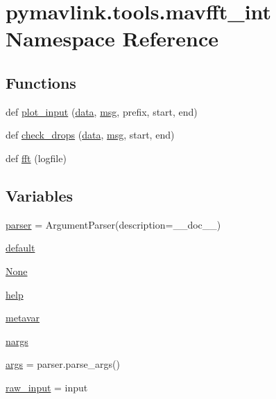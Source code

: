 \hypertarget{namespacepymavlink_1_1tools_1_1mavfft__int}{}\section{pymavlink.\+tools.\+mavfft\+\_\+int Namespace Reference}
\label{namespacepymavlink_1_1tools_1_1mavfft__int}
\subsection*{Functions}
\begin{DoxyCompactItemize}
\item 
def \mbox{\hyperlink{namespacepymavlink_1_1tools_1_1mavfft__int_ad676e5d5d87b9d552609c8379fe67870}{plot\+\_\+input}} (\mbox{\hyperlink{structdata}{data}}, \mbox{\hyperlink{stratnode_8cpp_a82cfe4ed9bc9e1b07c8bf209c324d85b}{msg}}, prefix, start, end)
\item 
def \mbox{\hyperlink{namespacepymavlink_1_1tools_1_1mavfft__int_a2ae39ff09927a9ada359b47eeb6e4c32}{check\+\_\+drops}} (\mbox{\hyperlink{structdata}{data}}, \mbox{\hyperlink{stratnode_8cpp_a82cfe4ed9bc9e1b07c8bf209c324d85b}{msg}}, start, end)
\item 
def \mbox{\hyperlink{namespacepymavlink_1_1tools_1_1mavfft__int_a4fea48da53af74119f00f7ddc66f87fb}{fft}} (logfile)
\end{DoxyCompactItemize}
\subsection*{Variables}
\begin{DoxyCompactItemize}
\item 
\mbox{\hyperlink{namespacepymavlink_1_1tools_1_1mavfft__int_a6399caa94e5528b597e4316134c2e937}{parser}} = Argument\+Parser(description=\+\_\+\+\_\+doc\+\_\+\+\_\+)
\item 
\mbox{\hyperlink{namespacepymavlink_1_1tools_1_1mavfft__int_a0e6a9b47e77e47f3e7a65850daa6bede}{default}}
\item 
\mbox{\hyperlink{namespacepymavlink_1_1tools_1_1mavfft__int_a51eb9bbd0dff74b63640e3ffcd329d47}{None}}
\item 
\mbox{\hyperlink{namespacepymavlink_1_1tools_1_1mavfft__int_a7edea492310d4fb2f90f2028606e2c5e}{help}}
\item 
\mbox{\hyperlink{namespacepymavlink_1_1tools_1_1mavfft__int_a319e6a187105fcfd07593d2568b83533}{metavar}}
\item 
\mbox{\hyperlink{namespacepymavlink_1_1tools_1_1mavfft__int_a410dc81e9fd097b44d0580d29cef27e7}{nargs}}
\item 
\mbox{\hyperlink{namespacepymavlink_1_1tools_1_1mavfft__int_a1096c19d6b3e2cd4071407b56498c6ac}{args}} = parser.\+parse\+\_\+args()
\item 
\mbox{\hyperlink{namespacepymavlink_1_1tools_1_1mavfft__int_a7e904179cf60a3f9dc98158156d21f8e}{raw\+\_\+input}} = input
\end{DoxyCompactItemize}


